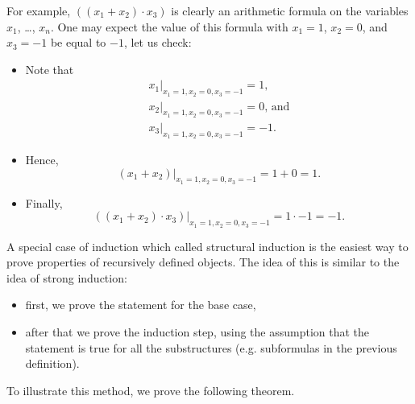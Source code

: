 For example, $((x_1 + x_2) \cdot x_3)$ is clearly an arithmetic formula on the
variables $x_1$, \dots, $x_n$. One may expect the value of this formula with
$x_1 = 1$, $x_2 = 0$, and $x_3 = -1$ be equal to $-1$, let us check:
\begin{itemize}
  \item Note that
    \[
      \begin{array}{l}
        x_1\big\rvert_{x_1 = 1, x_2 = 0, x_3 = -1} = 1, \\
        x_2\big\rvert_{x_1 = 1, x_2 = 0, x_3 = -1} = 0\text{, and} \\
        x_3\big\rvert_{x_1 = 1, x_2 = 0, x_3 = -1} = -1.
      \end{array}
    \]
  \item Hence,
    \[
      (x_1 + x_2)\big\rvert_{x_1 = 1, x_2 = 0, x_3 = -1} = 1 + 0 = 1.
    \]
  \item Finally,
    \[
      ((x_1 + x_2) \cdot x_3)\big\rvert_{x_1 = 1, x_2 = 0, x_3 = -1} = 1 \cdot -
      1 = -1.
    \]
\end{itemize}


A special case of induction which called structural induction is the easiest way
to prove properties of recursively defined objects. The idea of this is similar
to the idea of strong induction:
\begin{itemize}
  \item first, we prove the statement for the base case,
  \item after that we prove the induction step, using the assumption that the
    statement is true for all the substructures (e.g. subformulas in the
    previous definition).
\end{itemize}
To illustrate this method, we prove the following theorem.

